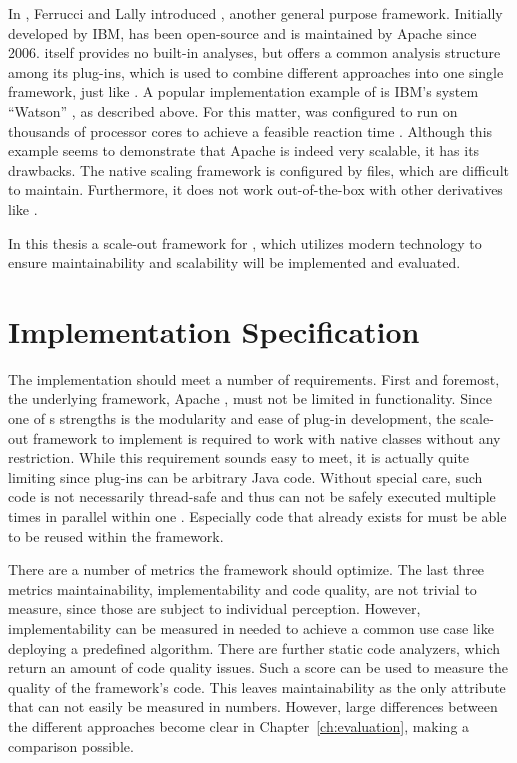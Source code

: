 In \cite{ferrucci2004uima}, Ferrucci and Lally introduced \uima{}, another general purpose \nlp{} framework. Initially developed by IBM, \uima{} has been open-source and is maintained by Apache since 2006. \uima{} itself provides no built-in \nlp{} analyses, but offers a common analysis structure among its plug-ins, which is used to combine different \nlp{} approaches into one single framework, just like \nlpGate{}. A popular implementation example of \uima{} is IBM's \qa{} system ``Watson'' \cite{ferrucci2012introduction,epstein2012making}, as described above. For this matter, \uima{} was configured to run on thousands of processor cores to achieve a feasible reaction time \cite{epstein2012making}. Although this example seems to demonstrate that Apache \uima{} is indeed very scalable, it has its drawbacks. The native \uima{} scaling framework \uimaas{} is configured by \xml{} files, which are difficult to maintain. Furthermore, it does not work out-of-the-box with other \uima{} derivatives like \uimafit{}. 

In this thesis a scale-out framework for \uima{}, which utilizes modern technology to ensure maintainability and scalability will be implemented and evaluated.

\section{Implementation Specification}
\label{sec:requirements}
The implementation should meet a number of requirements. First and foremost, the underlying framework, Apache \uima{}, must not be limited in functionality. Since one of \uima{}s strengths is the modularity and ease of plug-in development, the scale-out framework to implement is required to work with native \uima{} classes without any restriction. While this requirement sounds easy to meet, it is actually quite limiting since \uima{} plug-ins can be arbitrary Java code. Without special care, such code is not necessarily thread-safe and thus can not be safely executed multiple times in parallel within one \jvm{}. Especially code that already exists for \uima{} must be able to be reused within the framework.

There are a number of metrics the framework should optimize. The last three metrics maintainability, implementability and code quality, are not trivial to measure, since those are subject to individual perception. However, implementability can be measured in \loc{} needed to achieve a common use case like deploying a predefined \nlp{} algorithm. There are further static code analyzers, which return an amount of code quality issues. Such a score can be used to measure the quality of the framework's code. This leaves maintainability as the only attribute that can not easily be measured in numbers. However, large differences between the different approaches become clear in Chapter~\ref{ch:evaluation}, making a comparison possible.
